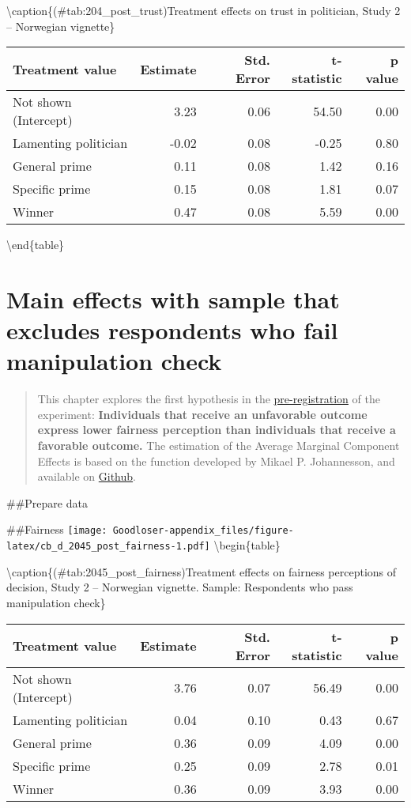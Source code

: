 \documentclass[
]{book}
\begin{document}
\textbackslash caption\{(\#tab:204\_post\_trust)Treatment effects on trust in politician, Study 2 -- Norwegian vignette\}
\centering

\begin{tabular}[t]{lrrrr}
\toprule
Treatment value & Estimate & Std. Error & t-statistic & p value\\
\midrule
Not shown (Intercept) & 3.23 & 0.06 & 54.50 & 0.00\\
Lamenting politician & -0.02 & 0.08 & -0.25 & 0.80\\
General prime & 0.11 & 0.08 & 1.42 & 0.16\\
Specific prime & 0.15 & 0.08 & 1.81 & 0.07\\
Winner & 0.47 & 0.08 & 5.59 & 0.00\\
\bottomrule
\end{tabular}

\textbackslash end\{table\}

\hypertarget{main-effects-with-sample-that-excludes-respondents-who-fail-manipulation-check}{%
\chapter{Main effects with sample that excludes respondents who fail manipulation check}\label{main-effects-with-sample-that-excludes-respondents-who-fail-manipulation-check}}

\begin{quote}
This chapter explores the first hypothesis in the \href{GoogLoser_Prereg_3_\#16823\%5B16065\%5D.pdf}{pre-registration} of the experiment: \textbf{Individuals that receive an unfavorable outcome express lower fairness perception than individuals that receive a favorable outcome.} The estimation of the Average Marginal Component Effects is based on the function developed by Mikael P. Johannesson, and available on \href{https://rdrr.io/github/mikajoh/descr2/man/amce.html}{Github}.
\end{quote}

\#\#Prepare data

\#\#Fairness
\texttt{[image: Goodloser-appendix\_files/figure-latex/cb\_d\_2045\_post\_fairness-1.pdf]} \textbackslash begin\{table\}

\textbackslash caption\{(\#tab:2045\_post\_fairness)Treatment effects on fairness perceptions of decision, Study 2 -- Norwegian vignette. Sample: Respondents who pass manipulation check\}
\centering

\begin{tabular}[t]{lrrrr}
\toprule
Treatment value & Estimate & Std. Error & t-statistic & p value\\
\midrule
Not shown (Intercept) & 3.76 & 0.07 & 56.49 & 0.00\\
Lamenting politician & 0.04 & 0.10 & 0.43 & 0.67\\
General prime & 0.36 & 0.09 & 4.09 & 0.00\\
Specific prime & 0.25 & 0.09 & 2.78 & 0.01\\
Winner & 0.36 & 0.09 & 3.93 & 0.00\\
\bottomrule
\end{tabular}
\end{document}
